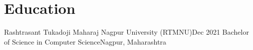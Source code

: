 \section{Education}
\resumeSubHeadingListStart
\resumeSubheading
{Rashtrasant Tukadoji Maharaj Nagpur University (RTMNU)}{Dec 2021}
{Bachelor of Science in Computer Science}{Nagpur, Maharashtra}
\resumeSubHeadingListEnd
\begin{minipage}[t]{\textwidth}
\end{minipage}